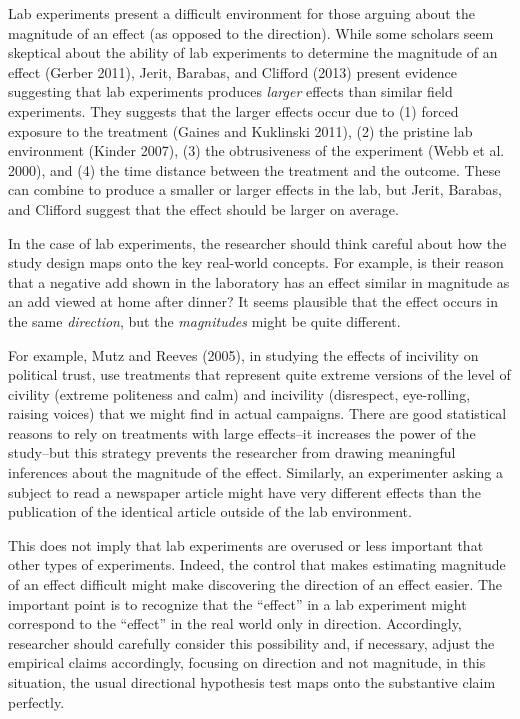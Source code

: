 \documentclass[12pt]{article}
\begin{document}
Lab experiments present a difficult environment for those arguing about the magnitude of an effect (as opposed to the direction). While some scholars seem skeptical about the ability of lab experiments to determine the magnitude of an effect (Gerber 2011), Jerit, Barabas, and Clifford (2013) present evidence suggesting that lab experiments produces \textit{larger} effects than similar field experiments. They suggests that the larger effects occur due to (1) forced exposure to the treatment (Gaines and Kuklinski 2011), (2) the pristine lab environment (Kinder 2007), (3) the obtrusiveness of the experiment (Webb et al. 2000), and (4) the time distance between the treatment and the outcome. These can combine to produce a smaller or larger effects in the lab, but Jerit, Barabas, and Clifford suggest that the effect should be larger on average.

In the case of lab experiments, the researcher should think careful about how the study design maps onto the key real-world concepts. For example, is their reason that a negative add shown in the laboratory has an effect similar in magnitude as an add viewed at home after dinner? It seems plausible that the effect occurs in the same \emph{direction}, but the \emph{magnitudes} might be quite different.

For example, Mutz and Reeves (2005), in studying the effects of incivility on political trust, use treatments that represent quite extreme versions of the level of civility (extreme politeness and calm) and incivility (disrespect, eye-rolling, raising voices) that we might find in actual campaigns. There are good statistical reasons to rely on treatments with large effects--it increases the power of the study--but this strategy prevents the researcher from drawing meaningful inferences about the magnitude of the effect. Similarly, an experimenter asking a subject to read a newspaper article might have very different effects than the publication of the identical article outside of the lab environment.

This does not imply that lab experiments are overused or less important that other types of experiments. Indeed, the control that makes estimating magnitude of an effect difficult might make discovering the direction of an effect easier. The important point is to recognize that the ``effect'' in a lab experiment might correspond to the ``effect'' in the real world only in direction. Accordingly, researcher should carefully consider this possibility and, if necessary, adjust the empirical claims accordingly, focusing on direction and not magnitude, in this situation, the usual directional hypothesis test maps onto the substantive claim perfectly.
\end{document}
